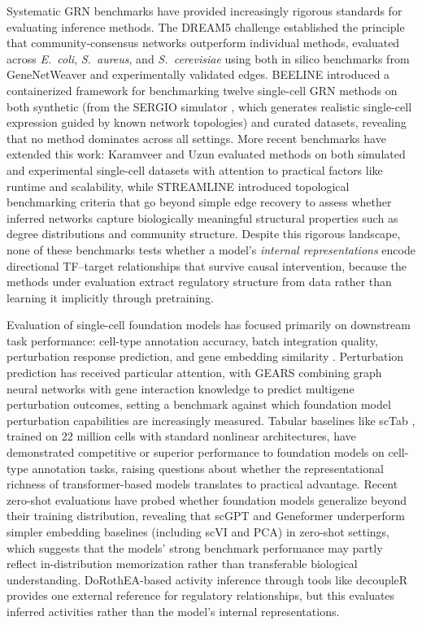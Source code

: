 \documentclass[10pt,letterpaper]{article}
\begin{document}
Systematic GRN benchmarks have provided increasingly rigorous standards for
evaluating inference methods. The DREAM5 challenge \cite{marbach_dream5_2012}
established the principle that community-consensus networks outperform
individual methods, evaluated across \textit{E.~coli}, \textit{S.~aureus},
and \textit{S.~cerevisiae} using both in silico benchmarks from GeneNetWeaver
\cite{schaffter_genenetweaver_2011} and experimentally validated edges.
BEELINE \cite{pratapa_beeline_2020} introduced a containerized framework for
benchmarking twelve single-cell GRN methods on both synthetic (from the
SERGIO simulator \cite{dibaeinia_sergio_2020}, which generates realistic
single-cell expression guided by known network topologies) and curated
datasets, revealing that no method dominates across all settings. More recent
benchmarks have extended this work: Karamveer and Uzun
\cite{karamveer_benchmark_2024} evaluated methods on both simulated and
experimental single-cell datasets with attention to practical factors like
runtime and scalability, while STREAMLINE \cite{stock_streamline_2024}
introduced topological benchmarking criteria that go beyond simple edge
recovery to assess whether inferred networks capture biologically meaningful
structural properties such as degree distributions and community structure.
Despite this rigorous landscape, none of these benchmarks tests whether a
model's \textit{internal representations} encode directional TF--target
relationships that survive causal intervention, because the methods under
evaluation extract regulatory structure from data rather than learning it
implicitly through pretraining.

Evaluation of single-cell foundation models has focused primarily on downstream
task performance: cell-type annotation accuracy, batch integration quality,
perturbation response prediction, and gene embedding similarity
\cite{cui_scgpt_2023,theodoris_geneformer_2023,hao_scfoundation_2024}.
Perturbation prediction has received particular attention, with GEARS
\cite{roohani_gears_2024} combining graph neural networks with gene
interaction knowledge to predict multigene perturbation outcomes, setting a
benchmark against which foundation model perturbation capabilities are
increasingly measured. Tabular baselines like scTab
\cite{fischer_sctab_2024}, trained on 22 million cells with standard
nonlinear architectures, have demonstrated competitive or superior
performance to foundation models on cell-type annotation tasks, raising
questions about whether the representational richness of transformer-based
models translates to practical advantage. Recent zero-shot evaluations
\cite{kedzierska_zeroshot_2025} have probed whether foundation models
generalize beyond their training distribution, revealing that scGPT and
Geneformer underperform simpler embedding baselines (including scVI and PCA)
in zero-shot settings, which suggests that the models' strong benchmark
performance may partly reflect in-distribution memorization rather than
transferable biological understanding. DoRothEA-based activity inference
through tools like decoupleR \cite{badia_decoupler_2022} provides one external
reference for regulatory relationships, but this evaluates inferred activities
rather than the model's internal representations.
\end{document}
